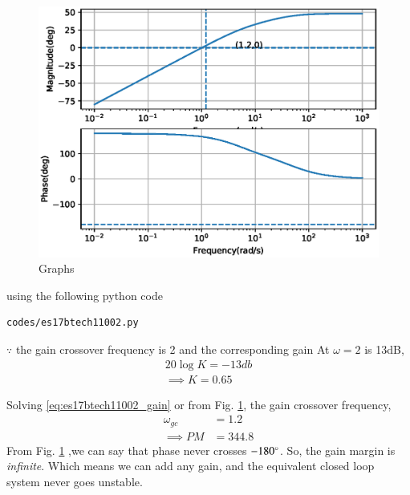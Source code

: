 \begin{figure}[!h]
\centering
  \includegraphics[width=\columnwidth]{./figs/es17btech11002/es17btech11002.eps}
  \caption{Graphs}
  \label{fig:es17btech11002}
\end{figure}
using the following python code 
\begin{lstlisting}
codes/es17btech11002.py
\end{lstlisting}
%
$\because $ the gain crossover frequency is 2 and the corresponding gain 
At $\omega = 2$ is 13dB,
\begin{align}
20\log K= -13db
\\
\implies K= 0.65
\end{align}

Solving \eqref{eq:es17btech11002_gain} or from Fig. \ref{fig:es17btech11002}, the gain crossover frequency,
\begin{align}
\omega_{gc} &=  1.2 \\
\implies
PM &=344.8
\end{align}
 From Fig. \ref{fig:es17btech11002} ,we can say that phase  never crosses $-180\degree$.
So, the gain margin is {\em infinite}.
Which means we can add any gain, and the equivalent closed loop system never goes unstable.
